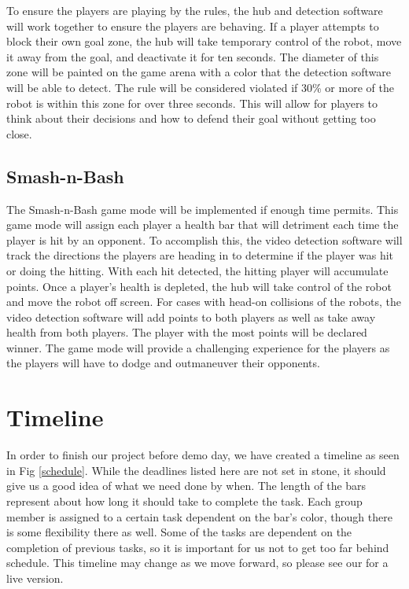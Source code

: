 \documentclass[11pt]{ieeeconf}
\begin{document}
To ensure the players are playing by the rules, the hub and detection software will work together to ensure the players are behaving. If a player attempts to block their own goal zone, the hub will take temporary control of the robot, move it away from the goal, and deactivate it for ten seconds. The diameter of this zone will be painted on the game arena with a color that the detection software will be able to detect. The rule will be considered violated if 30\% or more of the robot is within this zone for over three seconds. This will allow for players to think about their decisions and how to defend their goal without getting too close. 

\subsection{Smash-n-Bash}

The Smash-n-Bash game mode will be implemented if enough time permits. This game mode will assign each player a health bar that will detriment each time the player is hit by an opponent. To accomplish this, the video detection software will track the directions the players are heading in to determine if the player was hit or doing the hitting. With each hit detected, the hitting player will accumulate points. Once a player's health is depleted, the hub will take control of the robot and move the robot off screen. For cases with head-on collisions of the robots, the video detection software will add points to both players as well as take away health from both players. The player with the most points will be declared winner. The game mode will provide a challenging experience for the players as the players will have to dodge and outmaneuver their opponents. 

\section{Timeline}
In order to finish our project before demo day, we have created a timeline as seen in Fig \ref{schedule}. While the deadlines listed here are not set in stone, it should give us a good idea of what we need done by when. The length of the bars represent about how long it should take to complete the task. Each group member is assigned to a certain task dependent on the bar's color, though there is some flexibility there as well. Some of the tasks are dependent on the completion of previous tasks, so it is important for us not to get too far behind schedule. This timeline may change as we move forward, so please see our for a live version.
\end{document}
